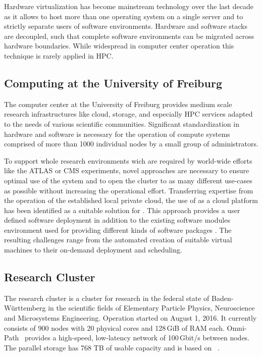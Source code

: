 Hardware virtualization has become mainstream technology over the last decade as it allows
to host more than one operating system on a single server and to strictly
separate users of software environments.
Hardware and software stacks are decoupled, such that complete software
environments can be migrated across hardware boundaries.
While widespread in computer center
operation this technique is rarely applied in HPC.

\subsection{Computing at the University of Freiburg}

The computer center at the University of Freiburg provides
medium scale research
infrastructures like cloud, storage, and especially HPC services adapted to the
needs of various scientific communities. Significant standardization
in hardware and software is necessary for the operation of compute systems comprised of
more than 1000 individual nodes by a small group of administrators.

To support whole research environments wich are required by world-wide efforts like the
ATLAS or CMS experiments, novel approaches are necessary to ensure optimal use of the system
and to open the cluster to as many different use-cases as
possible without increasing the operational effort.
Transferring expertise from the operation of the established local
private cloud, %
the use of \Openstack as a cloud platform has been identified
as a
suitable solution for \NEMO. This approach provides a user defined software
deployment in addition to the existing software modules environment used for
providing different kinds of software packages \cite{online:modules}.
The resulting challenges range from the automated creation of suitable
virtual machines to their on-demand deployment and scheduling.

\subsection{Research Cluster \NEMO}

The research cluster \NEMO is a cluster for 
research in the federal state of Baden-W\"urttemberg in the scientific fields of Elementary Particle Physics, Neuroscience and
Microsystems Engineering. Operation started on  August 1, 2016.
It currently consists of 900 nodes with 20 physical cores and 128\,GiB of RAM each.
Omni-Path~\cite{Omnipath} provides a high-speed, low-latency network of 100\,Gbit/s between nodes.
The parallel storage has
768 TB of usable capacity and is based on \BeeGFS~\cite{BeeGFS}.

